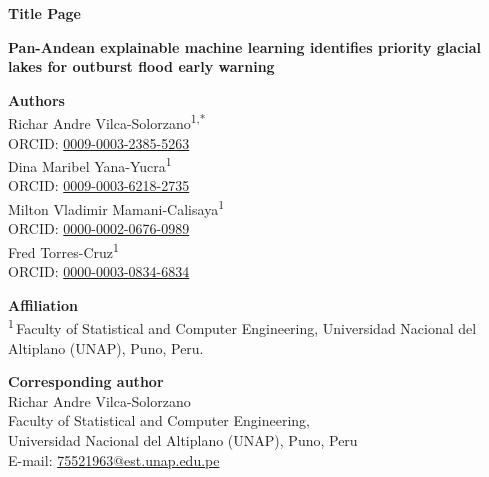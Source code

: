 \documentclass[11pt]{article}
\begin{document}
{\large\bfseries Title Page}\\[1.2em]

{\Large\bfseries Pan-Andean explainable machine learning identifies priority
glacial lakes for outburst flood early warning\par}

\vspace{2em}

{\bfseries Authors}\\[0.6em]
Richar Andre Vilca-Solorzano\textsuperscript{1,*}\\
\hspace*{1em}ORCID: \href{https://orcid.org/0009-0003-2385-5263}{0009-0003-2385-5263}\\[0.4em]
Dina Maribel Yana-Yucra\textsuperscript{1}\\
\hspace*{1em}ORCID: \href{https://orcid.org/0009-0003-6218-2735}{0009-0003-6218-2735}\\[0.4em]
Milton Vladimir Mamani-Calisaya\textsuperscript{1}\\
\hspace*{1em}ORCID: \href{https://orcid.org/0000-0002-0676-0989}{0000-0002-0676-0989}\\[0.4em]
Fred Torres-Cruz\textsuperscript{1}\\
\hspace*{1em}ORCID: \href{https://orcid.org/0000-0003-0834-6834}{0000-0003-0834-6834}\\

\vspace{1.5em}

{\bfseries Affiliation}\\[0.6em]
\textsuperscript{1}\,Faculty of Statistical and Computer Engineering,
Universidad Nacional del Altiplano (UNAP), Puno, Peru.

\vspace{1.5em}

{\bfseries Corresponding author}\\[0.6em]
Richar Andre Vilca-Solorzano\\
Faculty of Statistical and Computer Engineering,\\
Universidad Nacional del Altiplano (UNAP), Puno, Peru\\
E-mail: \href{mailto:75521963@est.unap.edu.pe}{75521963@est.unap.edu.pe}

\vspace{2em}
\end{document}
